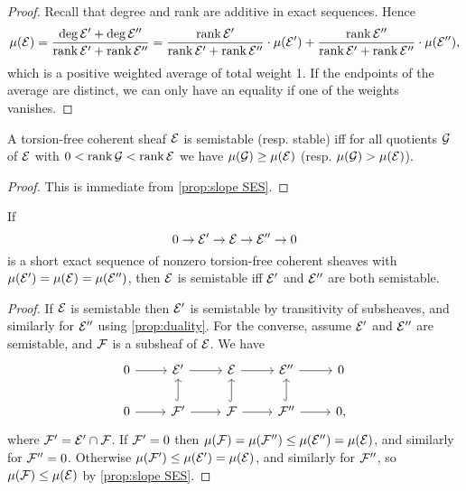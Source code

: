 \begin{proof}
    Recall that degree and rank are additive in exact sequences. Hence
    \begin{align*}
        \mu(\mathcal{E})
            = \frac{\deg\mathcal{E}'+\deg\mathcal{E}''}{\operatorname{rank}\mathcal{E}'+\operatorname{rank}\mathcal{E}''}
            = \frac{\operatorname{rank}\mathcal{E}'}{\operatorname{rank}\mathcal{E}'+\operatorname{rank}\mathcal{E}''}\cdot\mu(\mathcal{E}')
            + \frac{\operatorname{rank}\mathcal{E}''}{\operatorname{rank}\mathcal{E}'+\operatorname{rank}\mathcal{E}''}\cdot\mu(\mathcal{E}''),
    \end{align*}
    which is a positive weighted average of total weight 1. If the endpoints of
    the average are distinct, we can only have an equality if one of the weights
    vanishes.
\end{proof}

\begin{proposition}\label{prop:duality}
    A torsion-free coherent sheaf $\mathcal{E}$ is semistable (resp. stable) iff for
    all quotients $\mathcal{G}$ of $\mathcal{E}$ with $0<\operatorname{rank}\mathcal{G}<\operatorname{rank}\mathcal{E}$ we have
    $\mu(\mathcal{G})\ge\mu(\mathcal{E})$ (resp. $\mu(\mathcal{G})>\mu(\mathcal{E})$).
\end{proposition}

\begin{proof}
    This is immediate from \cref{prop:slope SES}.
\end{proof}

\begin{proposition}
    If
    \begin{equation*}
        0\to\mathcal{E}'\to\mathcal{E}\to\mathcal{E}''\to0
    \end{equation*}
    is a short exact sequence of nonzero torsion-free coherent sheaves with
    $\mu(\mathcal{E}')=\mu(\mathcal{E})=\mu(\mathcal{E}'')$, then $\mathcal{E}$ is semistable iff
    $\mathcal{E}'$ and $\mathcal{E}''$ are both semistable.
\end{proposition}

\begin{proof}
    If $\mathcal{E}$ is semistable then $\mathcal{E}'$ is semistable by transitivity of
    subsheaves, and similarly for $\mathcal{E}''$ using \cref{prop:duality}. For the
    converse, assume $\mathcal{E}'$ and $\mathcal{E}''$ are semistable, and $\mathcal{F}$ is a
    subsheaf of $\mathcal{E}$. We have
    \begin{equation*}
        \begin{tikzcd}
            0 \ar[r] & \calE' \ar[r] & \calE \ar[r] & \calE'' \ar[r] & 0 \\
            0 \ar[r] & \calF' \ar[r] \ar[u,hook] &
                \calF \ar[r] \ar[u,hook] & \calF'' \ar[r] \ar[u,hook] & 0,
        \end{tikzcd}
    \end{equation*}
    where $\mathcal{F}'=\mathcal{E}'\cap\mathcal{F}$. If $\mathcal{F}'=0$ then
    $\mu(\mathcal{F})=\mu(\mathcal{F}'')\le\mu(\mathcal{E}'')=\mu(\mathcal{E})$, and similarly for
    $\mathcal{F}''=0$. Otherwise $\mu(\mathcal{F}')\le\mu(\mathcal{E}')=\mu(\mathcal{E})$, and similarly
    for $\mathcal{F}''$, so $\mu(\mathcal{F})\le\mu(\mathcal{E})$ by \cref{prop:slope SES}.
\end{proof}


